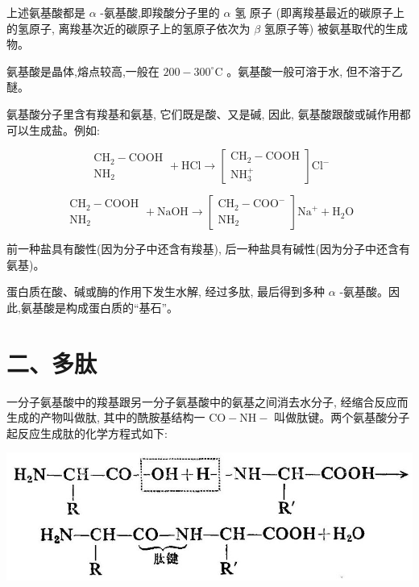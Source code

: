 \documentclass[10pt]{article}
\begin{document}
上述氨基酸都是 \(\alpha\) -氨基酸,即羧酸分子里的 \(\alpha\) 氢 原子 (即离羧基最近的碳原子上的氢原子, 离羧基次近的碳原子上的氢原子依次为 \(\beta\) 氢原子等) 被氨基取代的生成物。

氨基酸是晶体,熔点较高,一般在 \({200} - {300}^{ \circ }\mathrm{C}\) 。氨基酸一般可溶于水, 但不溶于乙醚。

氨基酸分子里含有羧基和氨基, 它们既是酸、又是碱, 因此, 氨基酸跟酸或碱作用都可以生成盐。例如:

\[
\begin{array}{l} {\mathrm{{CH}}}_{2} - \mathrm{{COOH}} \\ {\mathrm{{NH}}}_{2} \end{array} + \mathrm{{HCl}} \rightarrow \left\lbrack \begin{array}{l} {\mathrm{{CH}}}_{2} - \mathrm{{COOH}} \\ {\mathrm{{NH}}}_{3}^{ + } \end{array}\right\rbrack {\mathrm{{Cl}}}^{ - }
\]

\[
\begin{array}{l} {\mathrm{{CH}}}_{2} - \mathrm{{COOH}} \\ {\mathrm{{NH}}}_{2} \end{array} + \mathrm{{NaOH}} \rightarrow \left\lbrack \begin{array}{l} {\mathrm{{CH}}}_{2} - {\mathrm{{COO}}}^{ - } \\ {\mathrm{{NH}}}_{2} \end{array}\right\rbrack {\mathrm{{Na}}}^{ + } + {\mathrm{H}}_{2}\mathrm{O}
\]

前一种盐具有酸性(因为分子中还含有羧基), 后一种盐具有碱性(因为分子中还含有氨基)。

蛋白质在酸、碱或酶的作用下发生水解, 经过多肽, 最后得到多种 \(\alpha\) -氨基酸。因此,氨基酸是构成蛋白质的“基石”。

\section*{二、多肽}

一分子氨基酸中的羧基跟另一分子氨基酸中的氨基之间消去水分子, 经缩合反应而生成的产物叫做肽, 其中的酰胺基结构一 \(\mathrm{{CO}} - \mathrm{{NH}} -\) 叫做肽键。两个氨基酸分子起反应生成肽的化学方程式如下:

\begin{center}
\includegraphics[max width=1.0\textwidth]{images/01912d16-be99-77bb-9535-4f3ed8d9946f_172_692526.jpg}
\end{center}
\end{document}

